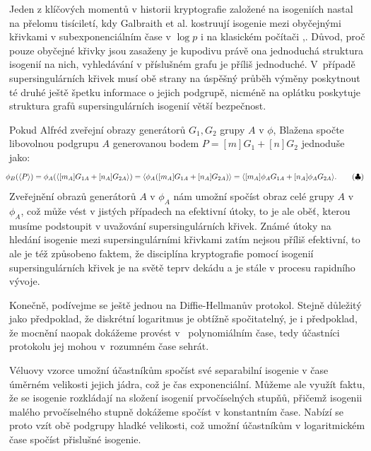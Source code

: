 \documentclass[12pt]{report}
\begin{document}
Jeden z klíčových momentů v historii kryptografie založené na isogeniích nastal na přelomu tisíciletí, kdy Galbraith et al. kostruují isogenie mezi obyčejnými křivkami v subexponenciálním čase v $\log p$ i na klasickém počítači \cite{Galbraith},\cite{Galbraith2}. Důvod, proč pouze obyčejné křivky jsou zasaženy je kupodivu právě ona jednoduchá struktura isogenií na nich, vyhledávání v příslušném grafu je příliš jednoduché. V~případě supersingulárních křivek musí obě strany na úspěšný průběh výměny poskytnout té druhé ještě špetku informace o jejich podgrupě, nicméně na oplátku poskytuje struktura grafů supersingulárních isogenií větší bezpečnost.

Pokud Alfréd zveřejní obrazy generátorů $G_{1},G_{2}$ grupy $A$ v $\phi$, Blažena spočte libovolnou podgrupu $A$ generovanou bodem $P = [m]G_{1} + [n]G_2$ jednoduše jako:
\begin{equation*}\label{clubsuit}
\hspace*{-0.2 cm} \phi_B (\langle P \rangle) = \phi_A (\langle [m_A] G_{1A} + [n_A] G_{2A} \rangle) = \langle \phi_A ([m_A] G_{1A} + [n_A] G_{2A}) \rangle = \langle [m_A] \phi_A G_{1A} + [n_A] \phi_A G_{2A} \rangle. \tag{$\clubsuit$}
\end{equation*}
Zveřejnění obrazů generátorů $A$ v $\phi_A$ nám umožní spočíst obraz celé grupy $A$ v $\phi_A$, což může vést v jistých případech na efektivní útoky, to je ale oběť, kterou musíme podstoupit v uvažování supersingulárních křivek. Známé útoky na hledání isogenie mezi supersingulárními křivkami zatím nejsou příliš efektivní, to ale je též způsobeno faktem, že disciplína kryptografie pomocí isogenií supersingulárních křivek je na světě teprv dekádu a je stále v procesu rapidního vývoje.

Konečně, podívejme se ještě jednou na Diffie-Hellmanův protokol. Stejně důležitý jako předpoklad, že diskrétní logaritmus je obtížně spočitatelný, je i předpoklad, že mocnění naopak dokážeme provést v~ polynomiálním čase, tedy účastníci protokolu jej mohou v~rozumném čase sehrát.

Véluovy vzorce umožní účastníkům spočíst své separabilní isogenie v čase úměrném velikosti jejich jádra, což je čas exponenciální. Můžeme ale využít faktu, že se isogenie rozkládají na složení isogenií prvočíselných stupňů, přičemž isogenii malého prvočíselného stupně dokážeme spočíst v konstantním čase. Nabízí se proto vzít obě podgrupy hladké velikosti, což umožní účastníkům v logaritmickém čase spočíst přislušné isogenie.
\end{document}
